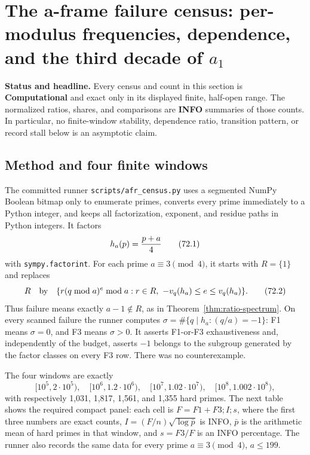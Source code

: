 \documentclass[10pt,reqno]{amsart}
\theoremstyle{definition}
\newcommand{\1}{\mathbf 1}
\begin{document}
\section{The a-frame failure census: per-modulus frequencies, dependence, and the third decade of $a_1$}
\label{sec:a-frame-census}

\medskip\noindent\textbf{Status and headline.}
Every census and count in this section is \textbf{Computational} and
exact only in its displayed finite, half-open range.  The normalized ratios,
shares, and comparisons are \textbf{INFO} summaries of those counts.  In
particular, no finite-window stability, dependence ratio, transition pattern,
or record stall below is an asymptotic claim.

\subsection{Method and four finite windows}

The committed runner \texttt{scripts/afr\_census.py} uses a segmented NumPy Boolean
bitmap only to enumerate primes, converts every prime immediately to a Python
integer, and keeps all factorization, exponent, and residue paths in Python
integers.  It factors
\begin{equation}
                         h_a(p)={p+a\over4}                 \tag{72.1}
\end{equation}
with \texttt{sympy.factorint}.  For each prime $a\equiv3\pmod4$, it starts with
$R=\{1\}$ and replaces
\begin{equation}
 R\quad\hbox{by}\quad
 \{r(q\bmod a)^e\bmod a:r\in R,\ -v_q(h_a)\leq e\leq v_q(h_a)\}.
                                                               \tag{72.2}
\end{equation}
Thus failure means exactly $a-1\notin R$, as in Theorem~\ref{thm:ratio-spectrum}.  On every
scanned failure the runner computes
$\sigma=\#\{q\mid h_a:(q/a)=-1\}$: F1 means $\sigma=0$, and F3 means
$\sigma>0$.  It asserts F1-or-F3 exhaustiveness and, independently of the
budget, asserts $-1$ belongs to the subgroup generated by the factor
classes on every F3 row.  There was no counterexample.

The four windows are exactly
\begin{equation}
 [10^5,2\cdot10^5),\quad[10^6,1.2\cdot10^6),\quad
 [10^7,1.02\cdot10^7),\quad[10^8,1.002\cdot10^8),             \tag{72.3}
\end{equation}
with respectively 1,031, 1,817, 1,561, and 1,355 hard primes.  The next table
shows the required compact panel: each cell is
$F=F1+F3;I;s$, where the first three numbers are exact counts,
$I=(F/n)\sqrt{\log\bar p}$ is INFO, $\bar p$ is the arithmetic mean of
hard primes in that window, and $s=F3/F$ is an INFO percentage.  The runner
also records the same data for every prime $a\equiv3\pmod4$, $a\leq199$.
\end{document}
